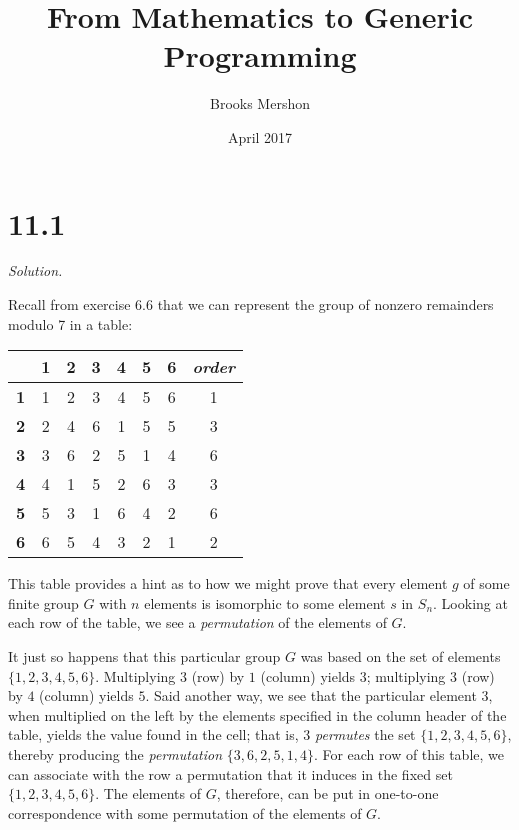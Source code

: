 \documentclass{article}
\title{From Mathematics to Generic Programming}
\author{Brooks Mershon}
\date{April 2017}
\begin{document}
\maketitle

\section*{11.1}

\textit{Solution.}

Recall from exercise 6.6 that we can represent the group of nonzero remainders modulo 7 in a table:

\begin{center}
\begin{tabular}{ c|c|c|c|c|c|c|c} 
 & \textbf{1} & \textbf{2} & \textbf{3} & \textbf{4} & \textbf{5} & \textbf{6} & \textit{order} \\
 \hline
 \textbf{1} & 1 & 2 & 3 & 4 & 5 & 6 & 1 \\ 
 \hline
 \textbf{2} & 2 & 4 & 6 & 1 & 5 & 5 & 3 \\ 
 \hline
 \textbf{3} & 3 & 6 & 2 & 5 & 1 & 4 & 6\\ 
 \hline
 \textbf{4} & 4 & 1 & 5 & 2 & 6 & 3 & 3\\ 
 \hline
 \textbf{5} & 5 & 3 & 1 & 6 & 4 & 2 & 6\\
 \hline
 \textbf{6} & 6 & 5 & 4 & 3 & 2 & 1 & 2\\
 \hline
\end{tabular}
\end{center}

This table provides a hint as to how we might prove that every element $g$ of some finite group $G$ with $n$ elements is isomorphic to some element $s$ in $S_n$. Looking at each row of the table, we see a \textit{permutation} of the elements of $G$.

It just so happens that this particular group $G$ was based on the set of elements $\{1, 2, 3, 4, 5, 6\}$. Multiplying $3$ (row) by $1$ (column) yields $3$; multiplying $3$ (row) by $4$ (column) yields $5$. Said another way, we see that the particular element $3$, when multiplied on the left by the elements specified in the column header of the table, yields the value found in the cell; that is, $3$ \textit{permutes} the set $\{1, 2, 3, 4, 5, 6\}$, thereby producing the \textit{permutation} $\{3, 6, 2, 5, 1, 4\}$. For each row of this table, we can associate with the row a permutation that it induces in the fixed set $\{1, 2, 3, 4, 5, 6\}$. The elements of $G$, therefore, can be put in one-to-one correspondence with some permutation of the elements of $G$.
\end{document}
